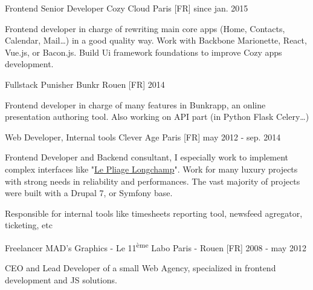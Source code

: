 
\vspace{-3mm}

\begin{cventries}

  \cventry
    {Frontend Senior Developer}
    {Cozy Cloud}
    {Paris [FR]}
    {since jan. 2015}
    {
      \begin{cvitems}
        \item{Frontend developer in charge of rewriting main core apps (Home, Contacts, Calendar, Mail\dots) in a good quality way. Work with Backbone \textfractionsolidus Marionette, React, Vue.js, or Bacon.js. Build Ui framework foundations to improve Cozy apps development.}
      \end{cvitems}
    }
  \vspace{\msetCventryBottomSkip}

  \cventry
    {Fullstack Punisher}
    {Bunkr}
    {Rouen [FR]}
    {2014}
    {
      \begin{cvitems}
        \item{Frontend developer in charge of many features in Bunkrapp, an online presentation authoring tool. Also working on API part (in Python \textfractionsolidus Flask \textfractionsolidus Celery\dots)}
      \end{cvitems}
    }
  \vspace{\msetCventryBottomSkip}

  \cventry
    {Web Developer, Internal tools}
    {Clever Age}
    {Paris [FR]}
    {may 2012 - sep. 2014}
    {
      \begin{cvitems}
        \item{Frontend Developer and Backend consultant, I especially work to implement complex interfaces like "\href{http://fr.longchamp.com/pliage/personnaliser/}{Le Pliage\textsuperscript{\textregistered} Longchamp}". Work for many luxury projects with strong needs in reliability and performances. The vast majority of projects were built with a Drupal 7, or Symfony base.}
        \item{Responsible for internal tools like timesheets reporting tool, newsfeed agregator, ticketing, etc}
      \end{cvitems}
    }
  \vspace{\msetCventryBottomSkip}

  \cventry
    {Freelancer}
    {MAD's Graphics - Le 11\textsuperscript{ème} Labo}
    {Paris - Rouen [FR]}
    {2008 - may 2012}
    {
      \begin{cvitems}
        \item{CEO and Lead Developer of a small Web Agency, specialized in frontend development and JS solutions.}
      \end{cvitems}
    }
  \vspace{\msetCventryBottomSkip}


\end{cventries}
